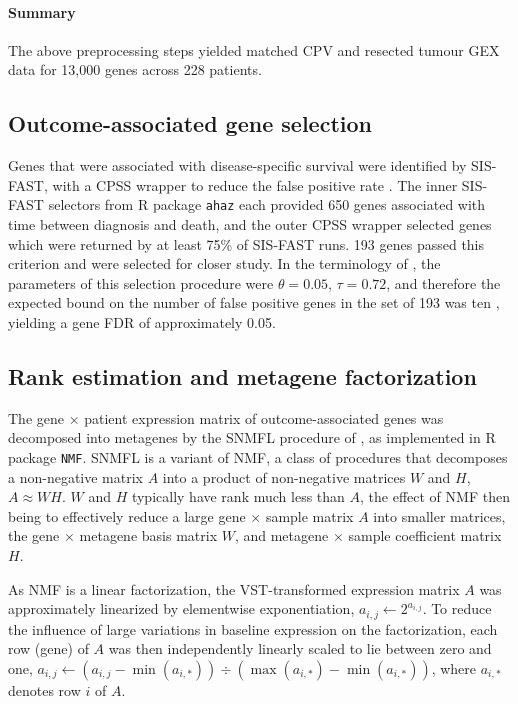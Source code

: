\documentclass[dissertation.tex]{subfiles}
\begin{document}
\paragraph{Summary}
The above preprocessing steps yielded matched \gls{CPV} and resected tumour \gls{GEX} data for 13,000 genes across 228 patients.

\subsection{Outcome-associated gene selection}
Genes that were associated with disease-specific survival were identified by \gls{SIS}-\gls{FAST}\cite{Gorst-Rasmussen2013}, with a \gls{CPSS} wrapper to reduce the false positive rate \cite{Shah2013}.  The inner \gls{SIS}-\gls{FAST} selectors from R package \texttt{ahaz} each provided 650 genes associated with time between diagnosis and death, and the outer \gls{CPSS} wrapper selected genes which were returned by at least 75\% of \gls{SIS}-\gls{FAST} runs.  193 genes passed this criterion and were selected for closer study.  
In the terminology of \cite{Shah2013}, the parameters of this selection procedure were $\theta = 0.05$, $\tau = 0.72$, and therefore the expected bound on the number of false positive genes in the set of 193 was ten \cite[table 1]{Shah2013}, yielding a gene \gls{FDR} of approximately 0.05.

\subsection{Rank estimation and metagene factorization}
\label{subsec:signatures-nmf}
The gene $\times$ patient expression matrix of outcome-associated genes was decomposed into metagenes by the \gls{SNMFL} procedure of \cite{Kim2007}, as implemented in R package \texttt{NMF}.  \gls{SNMFL} is a variant of \gls{NMF}, a class of procedures that decomposes a non-negative matrix $A$ into a product of non-negative matrices $W$ and $H$, $A \approx WH$.  $W$ and $H$ typically have rank much less than $A$, the effect of \gls{NMF} then being to effectively reduce a large gene $\times$ sample matrix $A$ into smaller matrices, the gene $\times$ metagene basis matrix $W$, and metagene $\times$ sample coefficient matrix $H$.

As \gls{NMF} is a linear factorization, the \gls{VST}-transformed expression matrix $A$ was approximately linearized by elementwise exponentiation, $a_{i,j} \leftarrow 2^{a_{i,j}}$.  To reduce the influence of large variations in baseline expression on the factorization, each row (gene) of $A$ was then independently linearly scaled to lie between zero and one, $a_{i,j} \leftarrow (a_{i,j} - \min(a_{i,*})) \div (\max(a_{i,*}) - \min(a_{i,*}))$, where $a_{i,*}$ denotes row $i$ of $A$.
\end{document}
